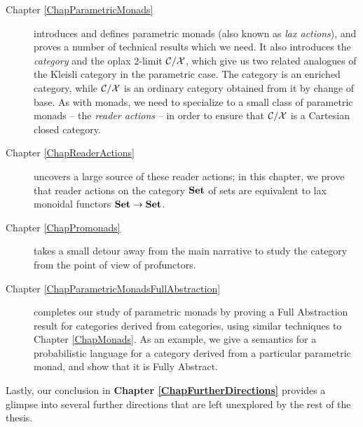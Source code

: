 \begin{description}
  \item[Chapter \ref{ChapParametricMonads}] introduces and defines parametric monads (also known as \emph{lax actions}), and proves a number of technical results which we need.
    It also introduces the \emph{\Mellies category} and the oplax $2$-limit ${\mathcal{C}}/\mathcal X$, which give us two related analogues of the Kleisli category in the parametric case.
    The \Mellies category is an enriched category, while ${\mathcal{C}}/\mathcal X$ is an ordinary category obtained from it by change of base.
    As with monads, we need to specialize to a small class of parametric monads -- the \emph{reader actions} -- in order to ensure that ${\mathcal{C}}/\mathcal X$ is a Cartesian closed category.
  \item[Chapter \ref{ChapReaderActions}] uncovers a large source of these reader actions; in this chapter, we prove that reader actions on the category ${\normalfont\textbf{Set}}$ of sets are equivalent to lax monoidal functors ${\normalfont\textbf{Set}} \to {\normalfont\textbf{Set}}$.
  \item[Chapter \ref{ChapPromonads}] takes a small detour away from the main narrative to study the \Mellies category from the point of view of profunctors.
  \item[Chapter \ref{ChapParametricMonadsFullAbstraction}] completes our study of parametric monads by proving a Full Abstraction result for categories derived from \Mellies categories, using similar techniques to Chapter \ref{ChapMonads}.
    As an example, we give a semantics for a probabilistic language for a category derived from a particular parametric monad, and show that it is Fully Abstract.
\end{description}
Lastly, our conclusion in {\bf Chapter \ref{ChapFurtherDirections}} provides a glimpse into several further directions that are left unexplored by the rest of the thesis.
